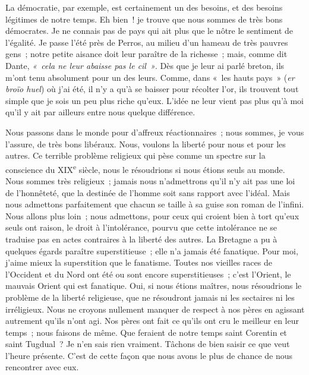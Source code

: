 \documentclass[french,twoside]{book} %
\newcommand\foreign[1]{\emph{#1}}
\newcommand\persName[1]{#1}
\newcommand\placeName[1]{#1}
\begin{document}
La démocratie, par exemple, est certainement un des besoins, et des besoins légitimes de notre temps. Eh bien ! je trouve que nous sommes de très bons démocrates. Je ne connais pas de pays qui ait plus que le nôtre le sentiment de l’égalité. Je passe l’été près de {\placeName Perros}, au milieu d’un hameau de très pauvres gens ; notre petite aisance doit leur paraître de la richesse ; mais, comme dit {\persName Dante}, \emph{« cela ne leur abaisse pas le cil »}. Dès que je leur ai parlé breton, ils m’ont tenu absolument pour un des leurs. Comme, dans « les hauts pays » (\foreign{{\itshape er broïo huel}}) où j’ai été, il n’y a qu’à se baisser pour récolter l’or, ils trouvent tout simple que je sois un peu plus riche qu’eux. L’idée ne leur vient pas plus qu’à moi qu’il y ait par ailleurs entre nous quelque différence.\par
Nous passons dans le monde pour d’affreux réactionnaires ; nous sommes, je vous l’assure, de très bons libéraux. Nous, voulons la liberté pour nous et pour les autres. Ce terrible problème religieux qui pèse comme un spectre sur la conscience du XIX\textsuperscript{e} siècle, nous le résoudrions si nous étions seuls au monde. Nous sommes très religieux ; jamais nous n’admettrons qu’il n’y ait pas une loi de l’honnêteté, que la destinée de l’homme soit sans rapport avec l’idéal. Mais nous admettons parfaitement que chacun se taille à sa guise son roman de l’infini. Nous allons plus loin ; nous admettons, pour ceux qui croient bien à tort qu’eux seuls ont raison, le droit à l’intolérance, pourvu que cette intolérance ne se traduise pas en actes contraires à la liberté des autres. La Bretagne a pu à quelques égards paraître superstitieuse ; elle n’a jamais été fanatique. Pour moi, j’aime mieux la superstition que le fanatisme. Toutes nos vieilles races de l’{\placeName Occident} et du {\placeName Nord} ont été ou sont encore superstitieuses ; c’est l’{\placeName Orient}, le mauvais {\placeName Orient} qui est fanatique. Oui, si nous étions maîtres, nous résoudrions le problème de la liberté religieuse, que ne résoudront jamais ni les sectaires ni les irréligieux. Nous ne croyons nullement manquer de respect à nos pères en agissant autrement qu’ils n’ont agi. Nos pères ont fait ce qu’ils ont cru le meilleur en leur temps ; nous faisons de même. Que feraient de notre temps {\persName saint Corentin} et {\persName saint Tugdual} ? Je n’en sais rien vraiment. Tâchons de bien saisir ce que veut l’heure présente. C’est de cette façon que nous avons le plus de chance de nous rencontrer avec eux.\par
\end{document}
